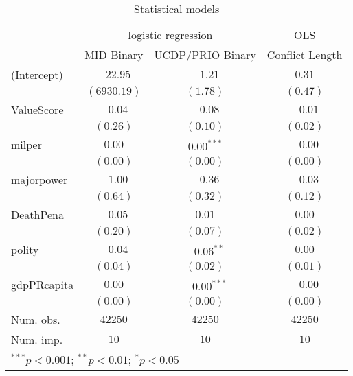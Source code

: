 
\begin{table}
\begin{center}
\begin{tabular}{l c c c}
\hline
 & \multicolumn{2}{c}{logistic regression} & \multicolumn{1}{c}{OLS} \\
\cline{2-3} \cline{4-4}
 & MID Binary & UCDP/PRIO Binary & Conflict Length \\
\hline
(Intercept) & $-22.95$    & $-1.21$       & $0.31$   \\
            & $(6930.19)$ & $(1.78)$      & $(0.47)$ \\
ValueScore  & $-0.04$     & $-0.08$       & $-0.01$  \\
            & $(0.26)$    & $(0.10)$      & $(0.02)$ \\
milper      & $0.00$      & $0.00^{***}$  & $-0.00$  \\
            & $(0.00)$    & $(0.00)$      & $(0.00)$ \\
majorpower  & $-1.00$     & $-0.36$       & $-0.03$  \\
            & $(0.64)$    & $(0.32)$      & $(0.12)$ \\
DeathPena   & $-0.05$     & $0.01$        & $0.00$   \\
            & $(0.20)$    & $(0.07)$      & $(0.02)$ \\
polity      & $-0.04$     & $-0.06^{**}$  & $0.00$   \\
            & $(0.04)$    & $(0.02)$      & $(0.01)$ \\
gdpPRcapita & $0.00$      & $-0.00^{***}$ & $-0.00$  \\
            & $(0.00)$    & $(0.00)$      & $(0.00)$ \\
\hline
Num. obs.   & $42250$     & $42250$       & $42250$  \\
Num. imp.   & $10$        & $10$          & $10$     \\
\hline
\multicolumn{4}{l}{\scriptsize{$^{***}p<0.001$; $^{**}p<0.01$; $^{*}p<0.05$}}
\end{tabular}
\caption{Statistical models}
\label{table:coefficients}
\end{center}
\end{table}
